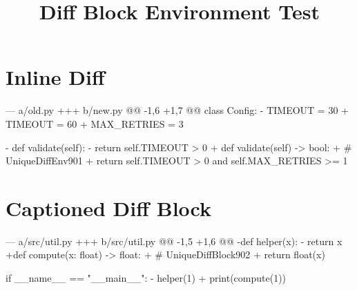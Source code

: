 \documentclass[code=listings]{SUSTechHomework}
\title{Diff Block Environment Test}
\begin{document}
\maketitle

\section{Inline Diff}

\begin{sustechdiff}
--- a/old.py
+++ b/new.py
@@ -1,6 +1,7 @@
 class Config:
-    TIMEOUT = 30
+    TIMEOUT = 60
+    MAX_RETRIES = 3
 
-    def validate(self):
-        return self.TIMEOUT > 0
+    def validate(self) -> bool:
+        # UniqueDiffEnv901
+        return self.TIMEOUT > 0 and self.MAX_RETRIES >= 1
\end{sustechdiff}

\section{Captioned Diff Block}

\begin{sustechdiffblock}
--- a/src/util.py
+++ b/src/util.py
@@ -1,5 +1,6 @@
-def helper(x):
-    return x
+def compute(x: float) -> float:
+    # UniqueDiffBlock902
+    return float(x)
 
 if __name__ == "__main__":
-    helper(1)
+    print(compute(1))
\end{sustechdiffblock}
\end{document}
